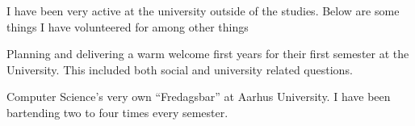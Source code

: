 I have been very active at the university outside of the studies. Below are some
things I have volunteered for among other things

\medskip

Planning and delivering a warm welcome first years for their first semester
at the University. This included both social and university related questions.

\divider

Computer Science's very own ``Fredagsbar'' at Aarhus University. I have been
bartending two to four times every semester.

\divider

